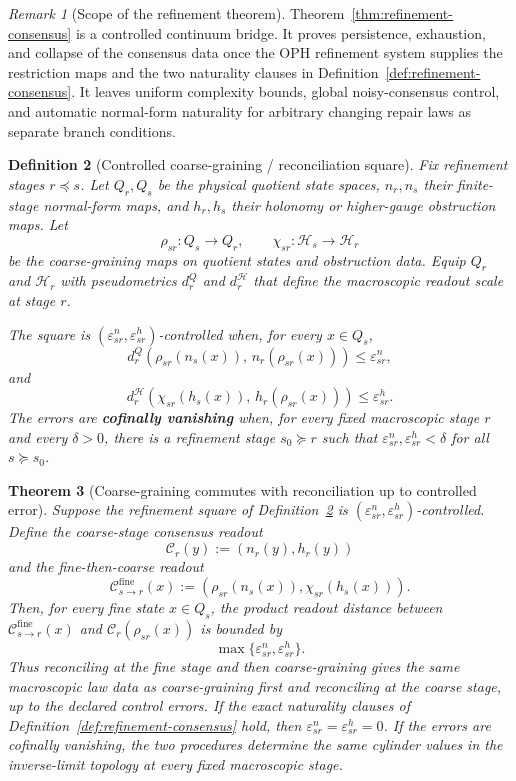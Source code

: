 \documentclass[11pt]{article}
\newtheorem{theorem}{Theorem}[section]
\newtheorem{definition}[theorem]{Definition}
\theoremstyle{remark}
\newtheorem{remark}[theorem]{Remark}
\theoremstyle{plain}
\begin{document}
\begin{remark}[Scope of the refinement theorem]\label{rem:refinement-consensus}
Theorem~\ref{thm:refinement-consensus} is a controlled continuum bridge. It proves persistence,
exhaustion, and collapse of the consensus data once the OPH refinement system supplies the
restriction maps and the two naturality clauses in Definition~\ref{def:refinement-consensus}. It
leaves uniform complexity bounds, global noisy-consensus control, and automatic normal-form
naturality for arbitrary changing repair laws as separate branch conditions.
\end{remark}

\begin{definition}[Controlled coarse-graining / reconciliation square]\label{def:controlled-coarse-consensus}
Fix refinement stages \(r\preceq s\). Let \(Q_r,Q_s\) be the physical quotient state spaces,
\(n_r,n_s\) their finite-stage normal-form maps, and \(h_r,h_s\) their holonomy or
higher-gauge obstruction maps. Let
\[
\rho_{sr}:Q_s\to Q_r,
\qquad
\chi_{sr}:\mathcal H_s\to\mathcal H_r
\]
be the coarse-graining maps on quotient states and obstruction data. Equip \(Q_r\) and
\(\mathcal H_r\) with pseudometrics \(d^Q_r\) and \(d^{\mathcal H}_r\) that define the
macroscopic readout scale at stage \(r\).

The square is \((\varepsilon^n_{sr},\varepsilon^h_{sr})\)-controlled when, for every
\(x\in Q_s\),
\[
d^Q_r\!\left(\rho_{sr}(n_s(x)),\,n_r(\rho_{sr}(x))\right)
\le \varepsilon^n_{sr},
\]
and
\[
d^{\mathcal H}_r\!\left(\chi_{sr}(h_s(x)),\,h_r(\rho_{sr}(x))\right)
\le \varepsilon^h_{sr}.
\]
The errors are \textbf{cofinally vanishing} when, for every fixed macroscopic stage \(r\) and
every \(\delta>0\), there is a refinement stage \(s_0\succeq r\) such that
\(\varepsilon^n_{sr},\varepsilon^h_{sr}<\delta\) for all \(s\succeq s_0\).
\end{definition}

\begin{theorem}[Coarse-graining commutes with reconciliation up to controlled error]\label{thm:coarse-grain-consensus}
Suppose the refinement square of Definition~\ref{def:controlled-coarse-consensus} is
\((\varepsilon^n_{sr},\varepsilon^h_{sr})\)-controlled. Define the coarse-stage consensus readout
\[
\mathcal C_r(y):=(n_r(y),h_r(y))
\]
and the fine-then-coarse readout
\[
\mathcal C_{s\to r}^{\mathrm{fine}}(x):=(\rho_{sr}(n_s(x)),\chi_{sr}(h_s(x))).
\]
Then, for every fine state \(x\in Q_s\), the product readout distance between
\(\mathcal C_{s\to r}^{\mathrm{fine}}(x)\) and \(\mathcal C_r(\rho_{sr}(x))\) is bounded by
\[
\max\{\varepsilon^n_{sr},\varepsilon^h_{sr}\}.
\]
Thus reconciling at the fine stage and then coarse-graining gives the same macroscopic law data
as coarse-graining first and reconciling at the coarse stage, up to the declared control errors.
If the exact naturality clauses of Definition~\ref{def:refinement-consensus} hold, then
\(\varepsilon^n_{sr}=\varepsilon^h_{sr}=0\). If the errors are cofinally vanishing, the two
procedures determine the same cylinder values in the inverse-limit topology at every fixed
macroscopic stage.
\end{theorem}
\end{document}
